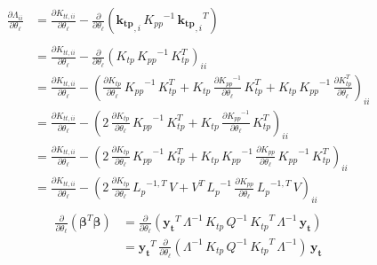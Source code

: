 \documentclass[11pt,a4paper]{article}
\numberwithin{equation}{section}
\begin{document}
\begin{align}
\frac{\partial \Lambda_{ii}}{\partial \theta_\ell}
  &= \frac{\partial K_{tt,ii}}{\partial \theta_\ell} - \frac{\partial}{\partial \theta_\ell}\left(\mathbf{k_{tp}}_{,i}\,{K_{pp}}^{-1}\,{\mathbf{k_{tp}}_{,i}}^T\right) \\ \\
  &= \frac{\partial K_{tt,ii}}{\partial \theta_\ell} - \frac{\partial}{\partial \theta_\ell}\left(K_{tp}\,{K_{pp}}^{-1}\,K_{tp}^T\right)_{ii} \\
  &= \frac{\partial K_{tt,ii}}{\partial \theta_\ell} - \left(\frac{\partial K_{tp}}{\partial \theta_\ell}\,{K_{pp}}^{-1}\,K_{tp}^T + K_{tp}\,\frac{\partial {K_{pp}}^{-1}}{\partial \theta_\ell}\,K_{tp}^T + K_{tp}\,{K_{pp}}^{-1}\,\frac{\partial K_{tp}^T}{\partial \theta_\ell}\right)_{ii} \\
  &= \frac{\partial K_{tt,ii}}{\partial \theta_\ell} - \left(2\,\frac{\partial K_{tp}}{\partial \theta_\ell}\,{K_{pp}}^{-1}\,K_{tp}^T + K_{tp}\,\frac{\partial {K_{pp}}^{-1}}{\partial \theta_\ell}\,K_{tp}^T\right)_{ii} \\
  &= \frac{\partial K_{tt,ii}}{\partial \theta_\ell} - \left(2\,\frac{\partial K_{tp}}{\partial \theta_\ell}\,{K_{pp}}^{-1}\,K_{tp}^T + K_{tp}\,{K_{pp}}^{-1}\,\frac{\partial K_{pp}}{\partial \theta_\ell}\,{K_{pp}}^{-1}\,K_{tp}^T\right)_{ii} \\
  &= \frac{\partial K_{tt,ii}}{\partial \theta_\ell} - \left(2\,\frac{\partial K_{tp}}{\partial \theta_\ell}\,{L_{p}}^{-1,T}\,V + V^T\,{L_p}^{-1}\,\frac{\partial K_{pp}}{\partial \theta_\ell}\,{L_{p}}^{-1,T}\,V\right)_{ii} \\
\end{align}
\begin{align}
\frac{\partial }{\partial \theta_\ell}\left({\bm \beta}^T{\bm \beta}\right)
  &= \frac{\partial }{\partial \theta_\ell}\left(\mathbf{y_t}^T\,\Lambda^{-1}\,K_{tp}\,Q^{-1}\,{K_{tp}}^T\,\Lambda^{-1}\,\mathbf{y_t}\right) \\
  &= \mathbf{y_t}^T\,\frac{\partial }{\partial \theta_\ell}\left(\Lambda^{-1}\,K_{tp}\,Q^{-1}\,{K_{tp}}^T\,\Lambda^{-1}\right)\,\mathbf{y_t} \\
\end{align}
\end{document}
